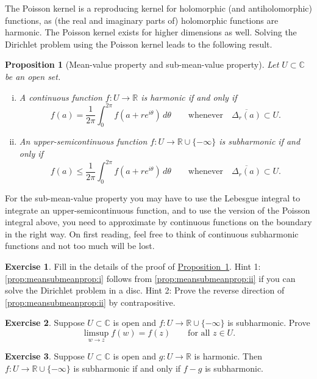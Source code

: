 \documentclass[12pt,openany]{book}
\newcommand{\C}{{\mathbb{C}}}
\newcommand{\R}{{\mathbb{R}}}
\theoremstyle{plain}
\newtheorem{prop}[thm]{Proposition}
\theoremstyle{remark}
\theoremstyle{definition}
\newenvironment{exbox}{%
    \def\FrameCommand{\vrule width 1pt \relax\hspace{10pt}}%
    \MakeFramed{\advance\hsize-\width\FrameRestore}%
}{%
    \endMakeFramed
}
\theoremstyle{exercise}
\newtheorem{exercise}{Exercise}[section]
\theoremstyle{example}
\newcommand{\propref}[1]{\hyperref[#1]{Proposition~\ref*{#1}}}
\begin{document}
The Poisson kernel is a reproducing kernel for
holomorphic (and antiholomorphic) functions, as (the real and imaginary parts of) holomorphic functions are harmonic.
The Poisson kernel exists for higher dimensions as well.
Solving the Dirichlet problem using the Poisson kernel leads to
the following result.

\begin{prop}[Mean-value property and sub-mean-value property]
\pagebreak[2]%
\label{prop:meansubmeanprop}%
%
%
Let $U \subset \C$ be an open set.
\begin{enumerate}[(i)]
\item
\label{prop:meansubmeanprop:i}%
A continuous function
$f \colon U \to \R$
is harmonic if and only if
\begin{equation*}
f(a) = \frac{1}{2\pi} \int_0^{2\pi} f(a+re^{i\theta})\, d\theta
\qquad \text{whenever} \quad
\overline{\Delta_r(a)} \subset U .
\end{equation*}
\item
\label{prop:meansubmeanprop:ii}%
An upper-semicontinuous function $f \colon U \to \R \cup \{ -\infty \}$
is subharmonic if and only if
\begin{equation*}
f(a) \leq \frac{1}{2\pi} \int_0^{2\pi} f(a+re^{i\theta})\, d\theta
\qquad \text{whenever} \quad
\overline{\Delta_r(a)} \subset U .
\end{equation*}
\end{enumerate}
\end{prop}

For the sub-mean-value property you may have to use
the Lebesgue integral to integrate an upper-semicontinuous function,
and to use the version of the Poisson integral above, you need to
approximate by continuous functions on the boundary in the right way.
On first reading, feel free to think of continuous subharmonic
functions and not too much will be lost.

\begin{exbox}
\begin{exercise}
Fill in the details of the proof of \propref{prop:meansubmeanprop}.
Hint 1: \ref{prop:meansubmeanprop:i} follows from
\ref{prop:meansubmeanprop:ii} if you can solve
the Dirichlet problem in a disc.
Hint 2: Prove the reverse direction of \ref{prop:meansubmeanprop:ii}
by contrapositive.
\end{exercise}

\begin{exercise} \label{exercise:limsupsubharmonic}
Suppose $U \subset \C$ is open and
$f \colon U \to \R \cup\{- \infty \}$ is subharmonic.  Prove
\begin{equation*}
\limsup_{w \to z} f(w) = f(z)
\qquad \text{for all $z \in U$.}
\end{equation*}
\end{exercise}

\begin{exercise} \label{exercise:fminusgsubharmonic}
Suppose $U \subset \C$ is open and $g \colon U \to \R$ is harmonic.
Then $f \colon U \to \R \cup \{ -\infty \}$ is subharmonic if and only if $f-g$
is subharmonic.
\end{exercise}
\end{exbox}
\end{document}
